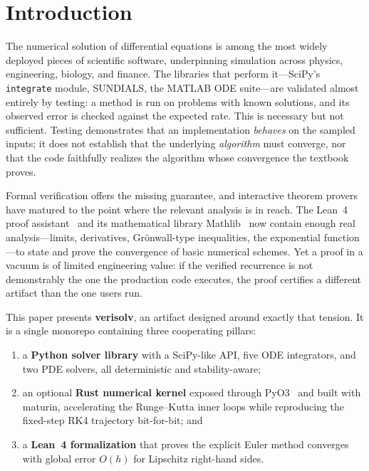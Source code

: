 \documentclass[sigplan,nonacm,screen]{acmart}
\begin{document}
\section{Introduction}
\label{sec:intro}

The numerical solution of differential equations is among the most widely
deployed pieces of scientific software, underpinning simulation across physics,
engineering, biology, and finance. The libraries that perform it---SciPy's
\texttt{integrate} module, SUNDIALS, the MATLAB ODE suite---are validated almost
entirely by testing: a method is run on problems with known solutions, and its
observed error is checked against the expected rate. This is necessary but not
sufficient. Testing demonstrates that an implementation \emph{behaves} on the
sampled inputs; it does not establish that the underlying \emph{algorithm} must
converge, nor that the code faithfully realizes the algorithm whose convergence
the textbook proves.

Formal verification offers the missing guarantee, and interactive theorem
provers have matured to the point where the relevant analysis is in reach. The
Lean~4 proof assistant~\cite{demoura2021lean4} and its mathematical library
Mathlib~\cite{mathlib2020} now contain enough real analysis---limits,
derivatives, Grönwall-type inequalities, the exponential function---to state and
prove the convergence of basic numerical schemes. Yet a proof in a vacuum is of
limited engineering value: if the verified recurrence is not demonstrably the
one the production code executes, the proof certifies a different artifact than
the one users run.

This paper presents \textbf{verisolv}, an artifact designed around exactly that
tension. It is a single monorepo containing three cooperating pillars:

\begin{enumerate}
\item a \textbf{Python solver library} with a SciPy-like API, five ODE
integrators, and two PDE solvers, all deterministic and stability-aware;
\item an optional \textbf{Rust numerical kernel} exposed through
PyO3~\cite{pyo3} and built with maturin, accelerating the Runge--Kutta inner
loops while reproducing the fixed-step RK4 trajectory bit-for-bit; and
\item a \textbf{Lean~4 formalization} that proves the explicit Euler method
converges with global error $O(h)$ for Lipschitz right-hand sides.
\end{enumerate}
\end{document}
